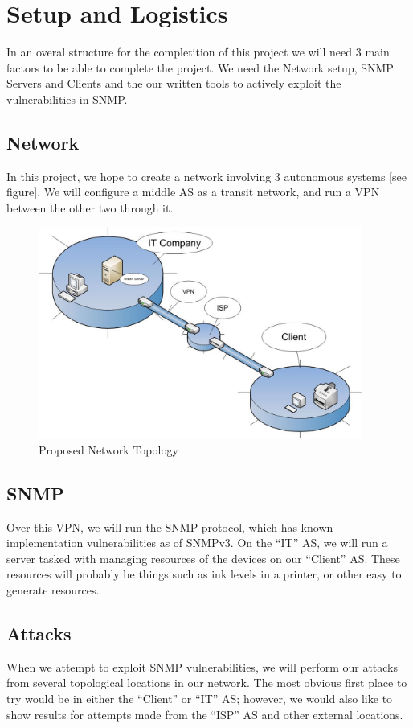 \documentclass[pdftex, 11pt]{article}
\begin{document}
\section{Setup and Logistics}
In an overal structure for the completition of this project
we will need 3 main factors to be able to complete the project.
We need the Network setup, SNMP Servers and Clients and the
our written tools to actively exploit the vulnerabilities in
SNMP.

\subsection{Network}
In this project, we hope to create a network involving 3 autonomous 
systems [see figure].  We will configure a middle AS as a transit   %
network, and run a VPN between the other two through it.

\begin{figure}
  \centering
  \includegraphics[width=0.95\textwidth, scale=1]{./figures/NetworkTopology.png}
  \caption{Proposed Network Topology}
\end{figure}

\subsection{SNMP}
Over this VPN, we will run the SNMP protocol, which has known 
implementation vulnerabilities as of SNMPv3. On the “IT” AS, we will 
run a server tasked with managing resources of the devices on our 
“Client” AS.  These resources will probably be things such as ink 
levels in a printer, or other easy to generate resources.

\subsection{Attacks}
When we attempt to exploit SNMP vulnerabilities, we will perform our 
attacks from several topological locations in our network.  The most 
obvious first place to try would be in either the “Client” or “IT” AS; 
however, we would also like to show results for attempts made from 
the “ISP” AS and other external locations.
\end{document}
